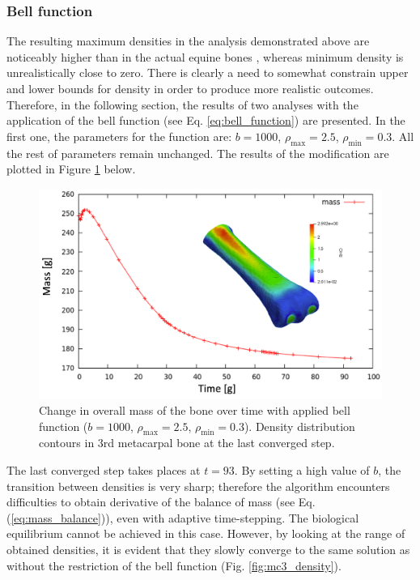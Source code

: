 \documentclass[11pt]{ACMEarticle}
\numberwithin{equation}{section}
\begin{document}
\subsubsection{Bell function}
\label{sec:bell}
The resulting maximum densities in the analysis demonstrated above are noticeably higher than in the actual equine bones \citep{yamada2015experimental}, whereas minimum density is unrealistically close to zero. There is clearly a need to somewhat constrain upper and lower bounds for density in order to produce more realistic outcomes.
Therefore, in the following section, the results of two analyses with the application of the bell function (see Eq. \ref{eq:bell_function}) are presented. In the first one, the parameters for the function are: $b = 1000$, $\rho_\mathrm{max} = 2.5$, $\rho_\mathrm{min} = 0.3$. All the rest of parameters remain unchanged. The results of the modification are plotted in Figure \ref{fig:density_bell1} below.
\begin{figure}[h!]
	\begin{centering}
		\includegraphics[width=15cm]{Figures/graphs/density_bell1}
		\caption{Change in overall mass of the bone over time with applied bell function ($b = 1000$, $\rho_\mathrm{max} = 2.5$, $\rho_\mathrm{min} = 0.3$). Density distribution contours in 3rd metacarpal bone at the last converged step.}
		\label{fig:density_bell1}
	\end{centering}
\end{figure}
The last converged step takes places at $t=93$. By setting a high value of $b$, the transition between densities is very sharp; therefore the algorithm encounters difficulties to obtain derivative of the balance of mass (see Eq. (\ref{eq:mass_balance})), even with adaptive time-stepping. The biological equilibrium cannot be achieved in this case. However, by looking at the range of obtained densities, it is evident that they slowly converge to the same solution as without the restriction of the bell function (Fig. \ref{fig:mc3_density}). 
\end{document}
